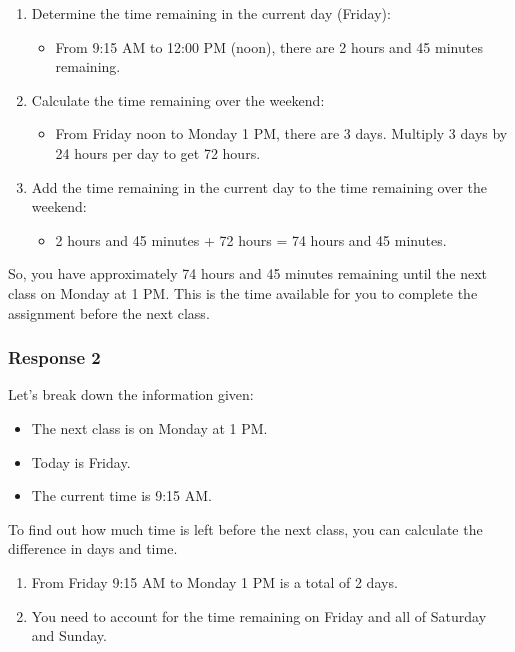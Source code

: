 \documentclass[12pt, a4paper]{article}
\begin{document}
\begin{enumerate}
    \item Determine the time remaining in the current day (Friday):
    \begin{itemize}
        \item From 9:15 AM to 12:00 PM (noon), there are 2 hours and 45 minutes remaining.
    \end{itemize}
    \item Calculate the time remaining over the weekend:
    \begin{itemize}
        \item From Friday noon to Monday 1 PM, there are 3 days. Multiply 3 days by 24 hours per day to get 72 hours.
    \end{itemize}
    \item Add the time remaining in the current day to the time remaining over the weekend:
    \begin{itemize}
        \item 2 hours and 45 minutes + 72 hours = 74 hours and 45 minutes.
    \end{itemize}
\end{enumerate}

So, you have approximately 74 hours and 45 minutes remaining until the next class on Monday at 1 PM. This is the time available for you to complete the assignment before the next class.

\subsubsection*{Response 2}
Let's break down the information given:

\begin{itemize}
    \item The next class is on Monday at 1 PM.
    \item Today is Friday.
    \item The current time is 9:15 AM.
\end{itemize}

To find out how much time is left before the next class, you can calculate the difference in days and time.

\begin{enumerate}
    \item From Friday 9:15 AM to Monday 1 PM is a total of 2 days.
    \item You need to account for the time remaining on Friday and all of Saturday and Sunday.
\end{enumerate}
\end{document}
